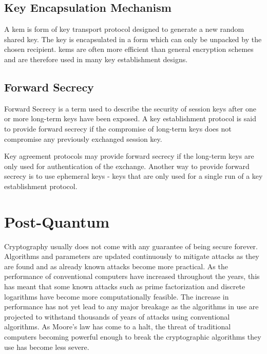 \subsection{Key Encapsulation Mechanism}

A \gls{kem} is form of key transport protocol designed to generate a new random shared key. The key is encapsulated in a form which can only be unpacked by the chosen recipient. \glspl{kem} are often more efficient than general encryption schemes and are therefore used in many key establishment designs\cite{boyd2020:key-encapsulation}.


\subsection{Forward Secrecy}

Forward Secrecy is a term used to describe the security of session keys after one or more long-term keys have been exposed. A key establishment protocol is said to provide forward secrecy if the compromise of long-term keys does not compromise any previously exchanged session key\cite{boyd2020:forward-secrecy}.

Key agreement protocols may provide forward secrecy if the long-term keys are only used for authentication of the exchange. Another way to provide forward secrecy is to use ephemeral keys - keys that are only used for a single run of a key establishment protocol\cite{boyd2020:forward-secrecy}.

\section{Post-Quantum}

Cryptography usually does not come with any guarantee of being secure forever. Algorithms and parameters are updated continuously to mitigate attacks as they are found and as already known attacks become more practical. As the performance of conventional computers have increased throughout the years, this has meant that some known attacks such as prime factorization and discrete logarithms have become more computationally feasible. The increase in performance has not yet lead to any major breakage as the algorithms in use are projected to withstand thousands of years of attacks using conventional algorithms. As Moore's law has come to a halt, the threat of traditional computers becoming powerful enough to break the cryptographic algorithms they use has become less severe.

